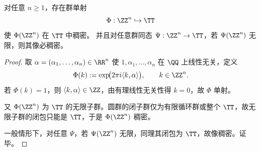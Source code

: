 \begin{theorem}[高圆维格点可单相位单射压入且像必稠密]\label{thm:conclusion-zn-to-circle-injective-dense}
对任意 \(n\ge 1\)，存在群单射
\[
\Phi:\ZZ^n\hookrightarrow \TT
\]
使 \(\Phi(\ZZ^n)\) 在 \(\TT\) 中稠密。
并且对任意群同态 \(\Psi:\ZZ^n\to\TT\)，若 \(\Psi(\ZZ^n)\) 无限，则其像必稠密。
\end{theorem}
\begin{proof}
取 \(\alpha=(\alpha_1,\dots,\alpha_n)\in\RR^n\) 使 \(1,\alpha_1,\dots,\alpha_n\) 在 \(\QQ\) 上线性无关，定义
\[
\Phi(k):=\exp\!\bigl(2\pi i\langle k,\alpha\rangle\bigr),\qquad k\in\ZZ^n.
\]
若 \(\Phi(k)=1\)，则 \(\langle k,\alpha\rangle\in\ZZ\)，由有理线性无关性得 \(k=0\)，故 \(\Phi\) 单射。

又 \(\Phi(\ZZ^n)\) 为 \(\TT\) 的无限子群。圆群的闭子群仅为有限循环群或整个 \(\TT\)，故无限子群的闭包只能是 \(\TT\)，于是 \(\Phi(\ZZ^n)\) 稠密。

一般情形下，对任意 \(\Psi\)，若 \(\Psi(\ZZ^n)\) 无限，同理其闭包为 \(\TT\)，故像稠密。证毕。
\end{proof}

